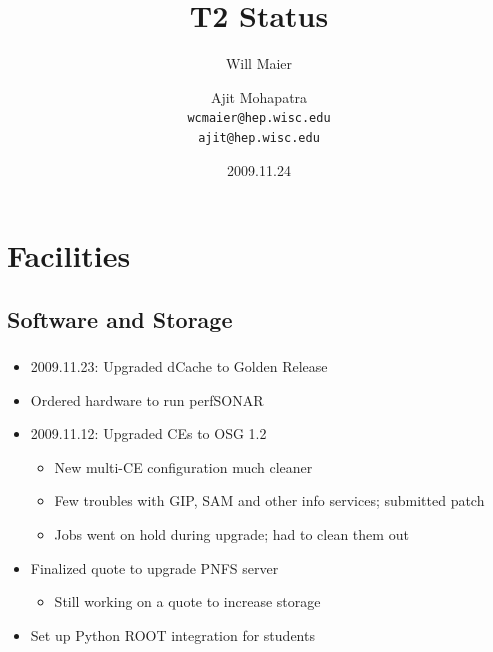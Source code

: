 \documentclass{beamer}
\title{T2 Status}
\author[Maier, Mohapatra]{
    Will Maier \and Ajit Mohapatra\\
    {\tt wcmaier@hep.wisc.edu}\\
    {\tt ajit@hep.wisc.edu}}
\institute[Wisconsin]{University of Wisconsin - High Energy Physics}
\date{2009.11.24}
\begin{document}
\begin{frame}
    \titlepage
\end{frame}


\section{Facilities}
\subsection{Software and Storage}
\begin{frame}
\frametitle{}

\begin{itemize}
	\item 2009.11.23: Upgraded dCache to Golden Release
	\item Ordered hardware to run perfSONAR
	\item 2009.11.12: Upgraded CEs to OSG 1.2
	\begin{itemize}
		\item New multi-CE configuration much cleaner
		\item Few troubles with GIP, SAM and other info services; submitted patch
		\item Jobs went on hold during upgrade; had to clean them out
	\end{itemize}
	\item Finalized quote to upgrade PNFS server
	\begin{itemize}
		\item Still working on a quote to increase storage
	\end{itemize}
	\item Set up Python ROOT integration for students
\end{itemize}
\end{frame}
\end{document}
